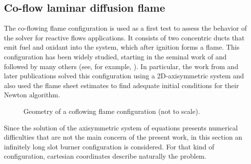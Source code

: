 
\subsection{Co-flow laminar diffusion flame}\label{ssec:coflowFlame}
The co-flowing flame configuration is used as a first test to assess the behavior of the solver for reactive flows applications. It consists of two concentric ducts that emit fuel and oxidant into the system, which after ignition forms a flame. This configuration has been widely studied, starting in the seminal work of \cite{burkeDiffusionFlames1928} and followed by many others (see, for example, \cite{smookeNumericalModelingAxisymmetric1992, smookeNumericalSolutionTwoDimensional1986,braackAdaptiveFiniteElement1997}). In particular, the work from \cite{smookeNumericalModelingAxisymmetric1992} and later publications solved this configuration using a 2D-axisymmetric system and also used the flame sheet estimates to find adequate initial conditions for their Newton algorithm. 
\begin{figure}[t]
	\centering
	\def\svgwidth{0.38\textwidth}
	\qquad\quad
	\def\svgwidth{0.35\textwidth}
	\caption{Geometry of a coflowing flame configuration (not to scale).} \label{fig:CoFlowGeometry}
\end{figure}

Since the solution of the axisymmetric system of equations presents numerical difficulties that are not the main concern of the present work, in this section an infinitely long slot burner configuration is considered. For that kind of configuration, cartesian coordinates describe naturally the problem. 

